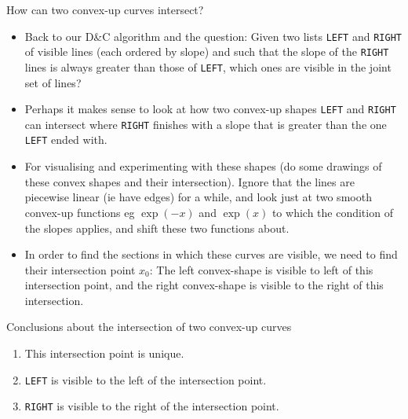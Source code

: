 \documentclass[ignorenonframetext,]{beamer}
\begin{document}
\begin{frame}{How can two convex-up curves intersect?}

  \begin{itemize}
  \item 
    Back to our D\&C algorithm and the question: Given two lists
    \texttt{LEFT} and \texttt{RIGHT} of
    visible lines (each ordered by slope) and such that the slope of the
    \texttt{RIGHT} lines is always greater than those of \texttt{LEFT},
    which ones are visible in the joint set of lines?
  \item 
    Perhaps it makes sense to look at how two convex-up shapes
    \texttt{LEFT} and \texttt{RIGHT} can intersect where \texttt{RIGHT}
    finishes with a slope that is greater than the one \texttt{LEFT} ended
    with.
  \item 
    For visualising and experimenting with these shapes (do some
    drawings of these convex shapes and their intersection). Ignore that
    the lines are piecewise linear (ie have edges) for a while, and
    look just at two smooth convex-up functions eg $\exp(-x)$ and $\exp(x)$ to which the
    condition of the slopes applies, and shift these two functions
    about.
  \item 
    In order to find the sections in which these curves are visible, we
    need to find their intersection point $x_0$: The left convex-shape
    is visible to left of this intersection point, and the right
    convex-shape is visible to the right of this intersection.
  \end{itemize}
\end{frame}

\begin{frame}{Conclusions about the intersection of two convex-up curves}
  
  \begin{enumerate}
  \item This intersection point is unique.
  \item \texttt{LEFT} is visible to the left of the intersection point.
  \item \texttt{RIGHT} is visible to the right of the intersection point.
  \end{enumerate}
\end{frame}
\end{document}

